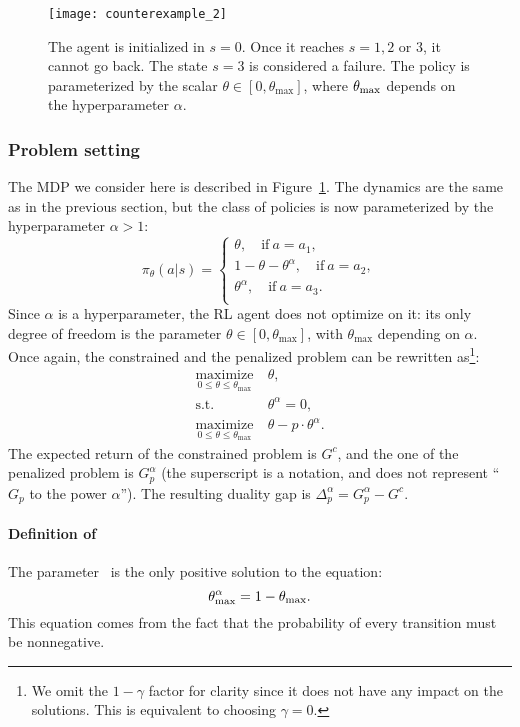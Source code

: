 \begin{figure}
	\centering
	\texttt{[image: counterexample\_2]}
	\caption{ The agent is initialized in $s=0$. Once it reaches $s=1, 2$ or $3$, it cannot go back. The state $s=3$ is considered a failure. The policy is parameterized by the scalar $\theta\in[0, \theta_{\text{max}}]$, where $\theta_\text{max}$ depends on the hyperparameter $\alpha$.}
	\label{fig:counterexample 2}
\end{figure}

\subsubsection{Problem setting}
The MDP we consider here is described in Figure~\ref{fig:counterexample 2}. The dynamics are the same as in the previous section, but the class of policies is now parameterized by the hyperparameter $\alpha > 1$:
$$
\pi_\theta(a|s) = \begin{cases}
\theta,\quad\text{if}~a=a_1,\\
1 - \theta - \theta^\alpha,\quad\text{if}~a=a_2,\\
\theta^\alpha,\quad\text{if}~a=a_3.\\
\end{cases}
$$
Since $\alpha$ is a hyperparameter, the RL agent does not optimize on it: its only degree of freedom is the parameter $\theta\in[0,\theta_\text{max}]$, with $\theta_\text{max}$ depending on $\alpha$. Once again, the constrained and the penalized problem can be rewritten as\footnote{We omit the $1-\gamma$ factor for clarity since it does not have any impact on the solutions. This is equivalent to choosing $\gamma = 0$.}:
\begin{align*}
\underset{0\leq\theta\leq\theta_\text{max}}{\text{maximize}}&~\theta,\\
\text{s.t.} &~\theta^\alpha = 0,\\
\underset{0\leq\theta\leq\theta_\text{max}}{\text{maximize}}&~\theta - p\cdot\theta^\alpha.
\end{align*}
The expected return of the constrained problem is $G^c$, and the one of the penalized problem is $G_p^\alpha$ (the superscript is a notation, and does not represent \enquote{$G_p$ to the power $\alpha$}). The resulting duality gap is $\Delta_p^\alpha = G_p^\alpha - G^c$.

\paragraph{Definition of \thetamax} The parameter \thetamax~is the only positive solution to the equation:
\begin{equation}
	\theta_\text{max}^\alpha = 1 - \theta_\text{max}.\label{eq:theta max}
\end{equation}
This equation comes from the fact that the probability of every transition must be nonnegative.

